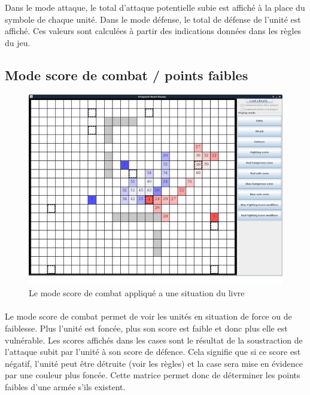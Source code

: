 			Dans le mode attaque, le total d'attaque potentielle subie est affiché à la place du symbole de chaque unité.
			Dans le mode défense, le total de défense de l'unité est affiché.
			Ces valeurs sont calculées à partir des indications données dans les règles du jeu.
			\clearpage	

		\subsection{Mode score de combat / points faibles}

			\begin{figure}[!h]
				\centerline{\includegraphics[scale=0.35]{images/screen_fscore.png}}
				\caption{Le mode score de combat appliqué a une situation du livre}
				\label{fig:partie_livre}
			\end{figure}
			
			\paragraph{}
			Le mode score de combat permet de voir les unités en situation de force ou de faiblesse.
			Plus l'unité est foncée, plus son score est faible et donc plus elle est vulnérable.
            Les scores affichés dans les cases sont le résultat de la soustraction de l'attaque subit par l'unité à son score de défence. Cela signifie que si ce score est négatif, l'unité peut être détruite (voir les règles) et la case sera mise en évidence par une couleur plus foncée.
			Cette matrice permet donc de déterminer les points faibles d'une armée s'ils existent.
			
